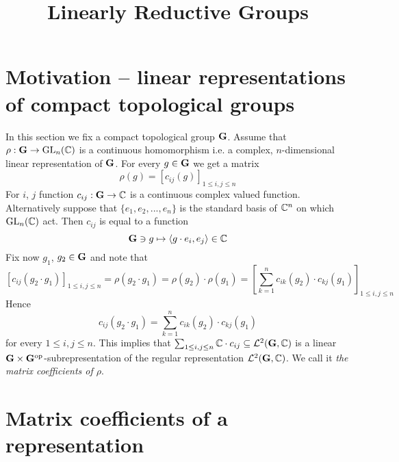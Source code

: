 



\title{Linearly Reductive Groups}
\date{}
\maketitle

\section{Motivation -- linear representations of compact topological groups}
\noindent
In this section we fix a compact topological group $\mathbf{G}$.
Assume that $\rho:\mathbf{G}\rightarrow \mathrm{GL}_n({\mathbb C})$ is a continuous homomorphism i.e. a complex, $n$-dimensional linear representation of $\mathbf{G}$. For every $g\in \mathbf{G}$ we get a matrix
$$\rho(g)=\left[c_{ij}(g)\right]_{1\leq i, j \leq n}$$
For $i$, $j$ function $c_{ij}:\mathbf{G}\rightarrow {\mathbb C}$ is a continuous complex valued function. Alternatively suppose that $\{e_1,e_2,...,e_n\}$ is the standard basis of ${\mathbb C}^n$ on which $\mathrm{GL}_n({\mathbb C})$ act. Then $c_{ij}$ is equal to a function 
$$\mathbf{G}\ni g \mapsto \langle g\cdot e_i, e_j\rangle \in {\mathbb C}$$
Fix now $g_1$, $g_2\in \mathbf{G}$ and note that
$$\left[c_{ij}(g_2\cdot g_1)\right]_{1\leq i,j\leq n}  = \rho(g_2\cdot g_1) = \rho(g_2)\cdot \rho(g_1) = \left[\sum_{k=1}^nc_{ik}(g_2)\cdot c_{kj}(g_1)\right]_{1\leq i,j\leq n}$$
Hence 
$$c_{ij}(g_2\cdot g_1) = \sum_{k=1}^nc_{ik}(g_2)\cdot c_{kj}(g_1)$$
for every $1\leq i,j\leq n$. This implies that $\sum_{1\leq i,j\leq n}{\mathbb C}\cdot c_{ij}\subseteq {\mathcal L}^2(\mathbf{G},{\mathbb C})$ is a linear $\mathbf{G}\times \mathbf{G}^{\mathrm{op}}$-subrepresentation of the regular representation ${\mathcal L}^2(\mathbf{G},{\mathbb C})$. We call it \textit{the matrix coefficients of $\rho$}. 

\section{Matrix coefficients of a representation}

